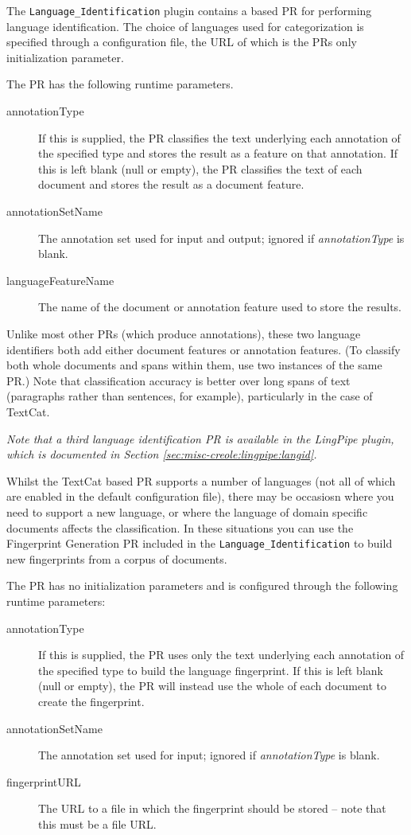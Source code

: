 The \texttt{Language\_Identification} plugin contains a
 based PR for
performing language identification. The choice of languages used for
categorization is specified through a configuration file, the URL of which
is the PRs only initialization parameter.


The PR has the following runtime parameters.
\begin{description}
\item[annotationType] If this is supplied, the PR classifies the text underlying
  each annotation of the specified type and stores the result as a feature on
  that annotation.  If this is left blank (null or empty), the PR classifies the
  text of each document and stores the result as a document feature.
\item[annotationSetName] The annotation set used for input and output; ignored
  if \emph{annotationType} is blank.
\item[languageFeatureName] The name of the document or annotation feature used
  to store the results.
\end{description}

Unlike most other PRs (which produce annotations), these two language
identifiers both add either document
features or annotation features.  (To classify both whole documents and spans
within them, use two instances of the same PR.)  Note that classification accuracy
is better over long spans of text (paragraphs rather than sentences, for
example), particularly in the case of TextCat.

\textit{Note that a third language identification PR is available in the LingPipe plugin,
which is documented in Section \ref{sec:misc-creole:lingpipe:langid}.}

Whilst the TextCat based PR supports a number of languages (not all of which are enabled in the default
configuration file), there may be occasiosn where you need to support a new language, or where the
language of domain specific documents affects the classification. In these situations you can use the
Fingerprint Generation PR included in the \texttt{Language\_Identification} to build new fingerprints
from a corpus of documents.

The PR has no initialization parameters and is configured through the following runtime parameters:
\begin{description}
\item[annotationType] If this is supplied, the PR uses only the text underlying
  each annotation of the specified type to build the language fingerprint.
  If this is left blank (null or empty), the PR will instead use the whole of
  each document to create the fingerprint.
\item[annotationSetName] The annotation set used for input; ignored
  if \emph{annotationType} is blank.
\item[fingerprintURL] The URL to a file in which the fingerprint should be
  stored -- note that this must be a file URL.
\end{description}

